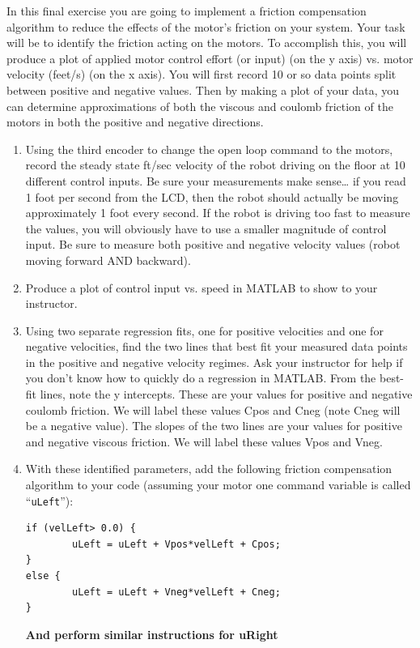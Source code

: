 \documentclass[11pt]{article}
\begin{document}
In this final exercise you are going to implement a friction compensation algorithm to reduce the effects of the motor’s friction on your system. Your task will be to identify the friction acting on the motors. To accomplish this, you will produce a plot of applied motor control effort (or input) (on the y axis) vs. motor velocity (feet/s) (on the x axis). You will first record 10 or so data points split between positive and negative values. Then by making a plot of your data, you can determine approximations of both the viscous and coulomb friction of the motors in both the positive and negative directions.
%
\begin{enumerate}
    \item Using the third encoder to change the open loop command to the motors, record the steady state ft/sec velocity of the robot driving on the floor at 10 different control inputs. Be sure your measurements make sense… if you read 1 foot per second from the LCD, then the robot should actually be moving approximately 1 foot every second. If the robot is driving too fast to measure the values, you will obviously have to use a smaller magnitude of control input. Be sure to measure both positive and negative velocity values (robot moving forward AND backward).
    \item \leavevmode
        \begin{checkoff}
                Produce a plot of control input vs. speed in MATLAB to show to your instructor.
        \end{checkoff}
    \item Using two separate regression fits, one for positive velocities and one for negative velocities, find the two lines that best fit your measured data points in the positive and negative velocity regimes. Ask your instructor for help if you don’t know how to quickly do a regression in MATLAB. From the best-fit lines, note the y intercepts. These are your values for positive and negative coulomb friction. We will label these values Cpos and Cneg (note Cneg will be a negative value). The slopes of the two lines are your values for positive and negative viscous friction. We will label these values Vpos and Vneg.
        \item With these identified parameters, add the following friction compensation algorithm to your code (assuming your motor one command variable is called “\texttt{uLeft}”):
\begin{verbatim}
if (velLeft> 0.0) {
        uLeft = uLeft + Vpos*velLeft + Cpos;
}
else {
        uLeft = uLeft + Vneg*velLeft + Cneg;
}
\end{verbatim}
        \textbf{And perform similar instructions for uRight}


\end{enumerate}
\end{document}
